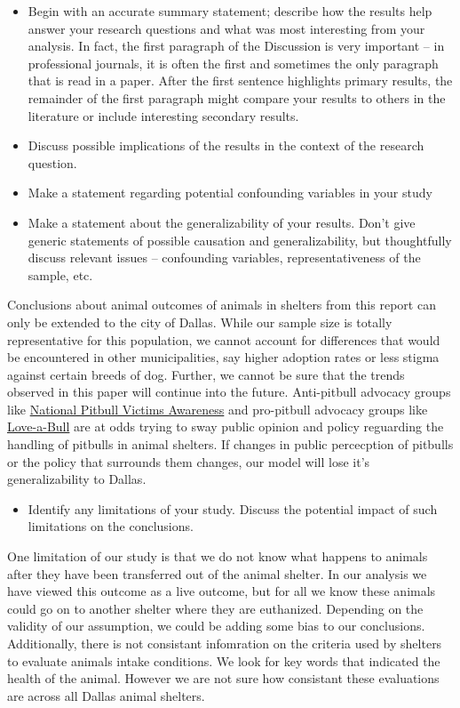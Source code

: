 \documentclass[]{article}
\providecommand{\tightlist}{%
  \setlength{\itemsep}{0pt}\setlength{\parskip}{0pt}}
\begin{document}
\begin{itemize}
\item
  Begin with an accurate summary statement; describe how the results
  help answer your research questions and what was most interesting from
  your analysis. In fact, the first paragraph of the Discussion is very
  important -- in professional journals, it is often the first and
  sometimes the only paragraph that is read in a paper. After the first
  sentence highlights primary results, the remainder of the first
  paragraph might compare your results to others in the literature or
  include interesting secondary results.
\item
  Discuss possible implications of the results in the context of the
  research question.
\item
  Make a statement regarding potential confounding variables in your
  study
\item
  Make a statement about the generalizability of your results. Don't
  give generic statements of possible causation and generalizability,
  but thoughtfully discuss relevant issues -- confounding variables,
  representativeness of the sample, etc.
\end{itemize}

Conclusions about animal outcomes of animals in shelters from this
report can only be extended to the city of Dallas. While our sample size
is totally representative for this population, we cannot account for
differences that would be encountered in other municipalities, say
higher adoption rates or less stigma against certain breeds of dog.
Further, we cannot be sure that the trends observed in this paper will
continue into the future. Anti-pitbull advocacy groups like
\href{https://www.nationalpitbullvictimawareness.org/}{National Pitbull
Victims Awareness} and pro-pitbull advocacy groups like
\href{http://love-a-bull.org/resources/statistics-pit-bull-bites-community-safety/}{Love-a-Bull}
are at odds trying to sway public opinion and policy reguarding the
handling of pitbulls in animal shelters. If changes in public
percecption of pitbulls or the policy that surrounds them changes, our
model will lose it's generalizability to Dallas.

\begin{itemize}
\tightlist
\item
  Identify any limitations of your study. Discuss the potential impact
  of such limitations on the conclusions.
\end{itemize}

One limitation of our study is that we do not know what happens to
animals after they have been transferred out of the animal shelter. In
our analysis we have viewed this outcome as a live outcome, but for all
we know these animals could go on to another shelter where they are
euthanized. Depending on the validity of our assumption, we could be
adding some bias to our conclusions. Additionally, there is not
consistant infomration on the criteria used by shelters to evaluate
animals intake conditions. We look for key words that indicated the
health of the animal. However we are not sure how consistant these
evaluations are across all Dallas animal shelters.
\end{document}
